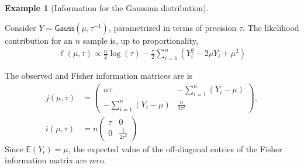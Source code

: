 \documentclass[
  11pt,
  letterpaper,
]{scrbook}
\theoremstyle{definition}
\theoremstyle{definition}
\newtheorem{example}{Example}[chapter]
\theoremstyle{definition}
\theoremstyle{plain}
\theoremstyle{plain}
\theoremstyle{remark}
\begin{document}
\begin{example}[Information for the Gaussian
distribution]\protect\hypertarget{exm-gauss}{}\label{exm-gauss}

Consider \(Y \sim \mathsf{Gauss}(\mu, \tau^{-1})\), parametrized in
terms of precision \(\tau\). The likelihood contribution for an \(n\)
sample is, up to proportionality, \begin{align*}
\ell(\mu, \tau) \propto \frac{n}{2}\log(\tau) - \frac{\tau}{2}\sum_{i=1}^n(Y_i^2-2\mu Y_i+\mu^2)
\end{align*}

The observed and Fisher information matrices are is \begin{align*}
j(\mu, \tau) &= \begin{pmatrix}
n\tau & -\sum_{i=1}^n (Y_i-\mu)\\
-\sum_{i=1}^n (Y_i-\mu) & \frac{n}{2\tau^2}
\end{pmatrix}, \\
i(\mu, \tau) &= n\begin{pmatrix}
\tau & 0\\
0 & \frac{1}{2\tau^2}
\end{pmatrix}
\end{align*} Since \(\mathsf{E}(Y_i) = \mu\), the expected value of the
off-diagonal entries of the Fisher information matrix are zero.

\end{example}
\end{document}
